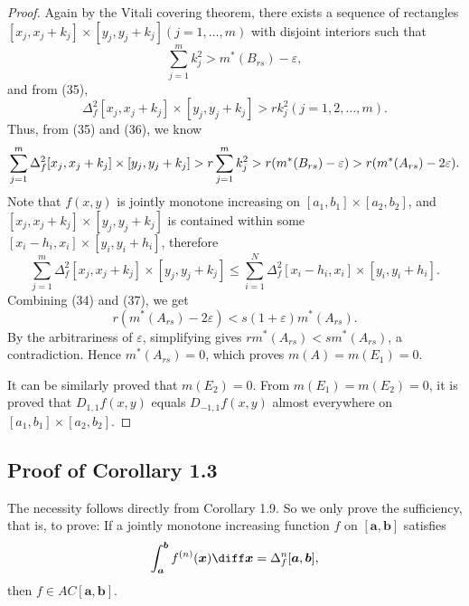 \documentclass{ijclclp}
\begin{document}
\begin{proof}
    Again by the Vitali covering theorem, there exists a sequence of rectangles 
    \([x_j,x_j+k_j]\times[y_j,y_j+k_j](j=1,\dots,m)\) with disjoint interiors such that 
    \begin{equation}
        \sum_{j=1}^{m}k_{j}^2>m^{*}(B_{rs})-\varepsilon,
    \end{equation}
    and from (35), 
    \[\Delta_f^2[x_j,x_j+k_j]\times[y_j,y_j+k_j]>rk_j^2(j=1,2,\dots,m).\]
    Thus, from (35) and (36), we know 
    \begin{equation}
        \sum_{j=1}^{m}\Delta_f^2[x_j,x_j+k_j]\times[y_j,y_j+k_j]
        >r\sum_{j=1}^{m}k_j^2\\
        >r(m^{*}(B_{rs})-\varepsilon)>r(m^{*}(A_{rs})-2\varepsilon).
    \end{equation}
    Note that \(f(x,y)\) is jointly monotone increasing on \([a_1,b_1]\times[a_2,b_2]\), and \([x_j,x_j+k_j]\times[y_j,y_j+k_j]\) is contained within some \([x_i-h_i,x_i]\times[y_i,y_i+h_i]\), therefore
    \[\sum_{j=1}^{m}\Delta_f^2[x_j,x_j+k_j]\times[y_j,y_j+k_j]\leqslant\sum_{i=1}^{N}\Delta_f^2[x_i-h_i,x_i]\times[y_i,y_i+h_i].\]
    Combining (34) and (37), we get
    \[r(m^{*}(A_{rs})-2\varepsilon)<s(1+\varepsilon)m^{*}(A_{rs}).\]
    By the arbitrariness of \(\varepsilon\), simplifying gives \(rm^*(A_{rs})<sm^*(A_{rs})\), a contradiction. Hence \(m^*(A_{rs})=0\), which proves \(m(A)=m(E_1)=0\).

    It can be similarly proved that \(m(E_2)=0\). From \(m(E_1)=m(E_2)=0\), it is proved that \(D_{1,1}f(x,y)\) equals \(D_{-1,1}f(x,y)\) almost everywhere on \([a_1,b_1]\times[a_2,b_2]\).
\end{proof}

\subsection{Proof of Corollary 1.3}
The necessity follows directly from Corollary 1.9. So we only prove the sufficiency, that is, to prove: If a jointly monotone increasing function \(f\) on \([\boldsymbol{a},\boldsymbol{b}]\) satisfies
\begin{equation}
    \int_{\boldsymbol{a}}^{\boldsymbol{b}}f^{(n)}(\boldsymbol{x})\diff\boldsymbol{x}=\Delta_f^n[\boldsymbol{a},\boldsymbol{b}],
\end{equation}
then \(f\in AC[\boldsymbol{a},\boldsymbol{b}]\).
\end{document}
